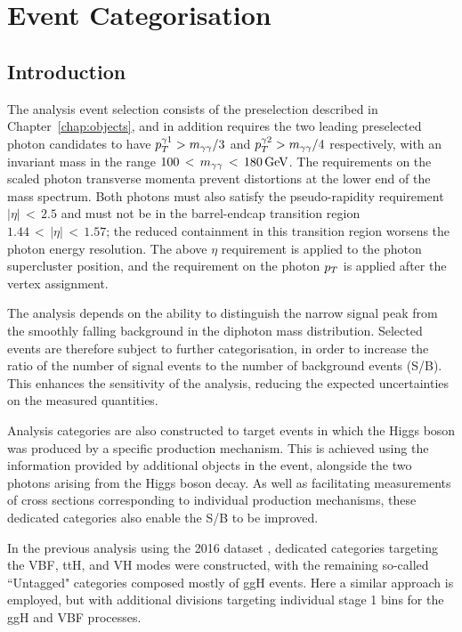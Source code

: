 \chapter{Event Categorisation}
\label{chap:categorisation}

\section{Introduction}

The analysis event selection consists of the preselection described in Chapter~\ref{chap:objects}, 
and in addition requires the two leading preselected photon candidates to have 
$p_T^{\gamma 1} > m_{\gamma\gamma}/3$ and $p_T^{\gamma 2} > m_{\gamma\gamma} /4$ respectively, 
with an invariant mass in the range $100\,<\,m_{\gamma\gamma}\,<\,\SI{180}{GeV}$.
The requirements on the scaled photon transverse momenta prevent distortions 
at the lower end of the mass spectrum.
Both photons must also satisfy the
pseudo-rapidity requirement $|\eta|\,<\,2.5$ and must not be in the barrel-endcap
transition region $1.44\,<\,|\eta|\,<\,1.57$;
the reduced containment in this transition region worsens the photon energy resolution.
The above $\eta$ requirement is applied to the photon supercluster
position, and the requirement on the photon $p_T$ is applied 
after the vertex assignment.

The \Hgg analysis depends on the ability to distinguish the narrow signal peak 
from the smoothly falling background in the diphoton mass distribution. 
Selected events are therefore subject to further categorisation, in order to 
increase the ratio of the number of signal events to the number of background events (S/B).
This enhances the sensitivity of the analysis, 
reducing the expected uncertainties on the measured quantities.

Analysis categories are also constructed to target events in which the Higgs boson was 
produced by a specific production mechanism. 
This is achieved using the information provided by additional objects in the event, 
alongside the two photons arising from the Higgs boson decay.
As well as facilitating measurements of cross sections corresponding 
to individual production mechanisms, these dedicated categories also enable the S/B to be improved.

In the previous \Hgg analysis using the 2016 dataset \cite{HIG-16-040}, 
dedicated categories targeting the VBF, ttH, and VH modes were constructed, 
with the remaining so-called ``Untagged" categories composed mostly of ggH events.
Here a similar approach is employed, 
but with additional divisions targeting individual stage 1 bins for the ggH and VBF processes.


